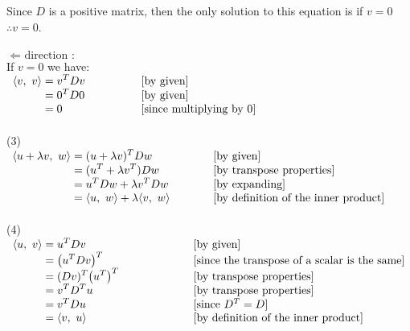 \documentclass[12pt]{article}
\begin{document}
Since $D$ is a positive matrix, then the only solution to this equation is if $v = 0$ 
$\therefore v = 0$.
\\\\
$\Longleftarrow \text{ direction :}$\\
If $v = 0$ we have:\\
{$\begin{array}{r@{}>{\displaystyle}ll}
		\langle v, \ v \rangle & {}= v^T D v  \qquad \qquad & [\text{by given}]               \\
		                       & {}= 0^T D 0                & [\text{by given}]               \\
		                       & {}= 0                      & [\text{since multiplying by }0] \\
	\end{array}$}
\\\\
(3)\\ {$\begin{array}{r@{}>{\displaystyle}ll}
		\langle u+\lambda v, \ w \rangle & {}= (u+\lambda v)^T D w                                                   & [\text{by given}]                           \\
		                                 & {}= (u^T+\lambda v^T) D w                                                 & [\text{by transpose properties}]            \\
		                                 & {}= u^T D w +\lambda v^T D w                                              & [\text{by expanding}]                       \\
		                                 & {}= \langle u, \ w \rangle + \lambda\langle v, \ w \rangle \hspace*{10mm} & [\text{by definition of the inner product}] \\
	\end{array}$}
\\\\
(4)\\ {$\begin{array}{r@{}>{\displaystyle}ll}
		\langle u, \ v\rangle & {}= u^T D v                                & [\text{by given}]                                    \\
		                      & {}= \big(u^T D v\big)^T                    & [\text{since the transpose of a scalar is the same}] \\
		                      & {}= (Dv)^T \big(u ^T\big)^T \hspace*{20mm} & [\text{by transpose properties}]                     \\
		                      & {}= v^T D^T u                              & [\text{by transpose properties}]                     \\
		                      & {}= v^T D u                                & [\text{since }D^T = D]                               \\
		                      & {}= \langle v, \ u\rangle                  & [\text{by definition of the inner product}]          \\
	\end{array}$}
\end{document}
